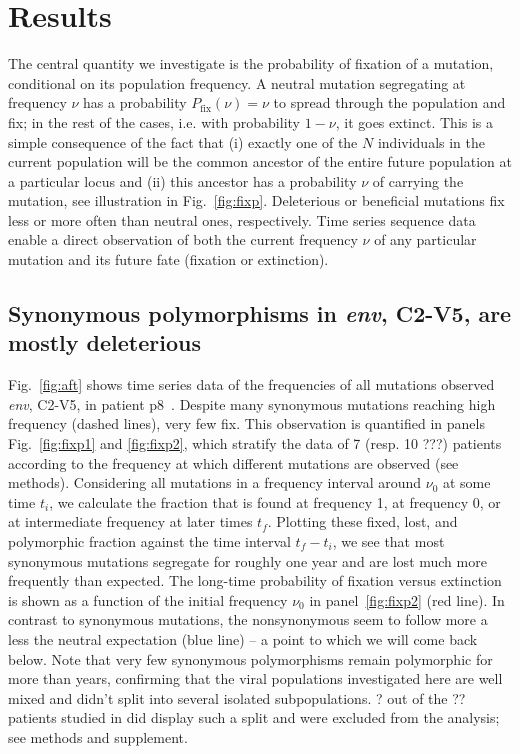 \documentclass[rmp, twocolumn]{revtex4}
\newcommand{\FIG}[1]{Fig.~\ref{fig:#1}}
\newcommand{\env}{\textit{env}}
\begin{document}
\section{Results}

The central quantity we investigate is the probability of fixation of a
mutation, conditional on its population frequency.  A neutral mutation
segregating at frequency $\nu$ has a probability $P_\text{fix}(\nu) = \nu$ to
spread through the population and fix; in the rest of the cases, i.e. with
probability $1-\nu$, it goes extinct. This is a simple consequence of the fact
that (i) exactly one of the $N$ individuals in the current population will be
the common ancestor of the entire future population at a particular locus and
(ii) this ancestor has a probability $\nu$ of carrying the mutation, see
illustration in \FIG{fixp}.  Deleterious or beneficial mutations fix less or
more often than neutral ones, respectively. Time series sequence data enable a
direct observation of both the current frequency $\nu$ of any particular
mutation and its future fate (fixation or extinction). 


\subsection{Synonymous polymorphisms in \env, C2-V5, are mostly deleterious}

\FIG{aft} shows time series data of the frequencies of all mutations observed
\env, C2-V5, in patient p8~\citep{shankarappa_consistent_1999}. Despite many
synonymous mutations reaching high frequency (dashed lines), very few fix. This
observation is quantified in panels \FIG{fixp1} and \ref{fig:fixp2}, which
stratify the data of 7 (resp. 10 ???) patients according to the frequency at
which different mutations are observed (see methods). Considering all mutations in a
frequency interval around $\nu_0$ at some time $t_i$, we calculate the fraction
that is found at frequency 1, at frequency 0, or at intermediate frequency at
later times $t_f$. Plotting these fixed, lost, and polymorphic fraction against
the time interval $t_f-t_i$, we see that most synonymous mutations segregate for
roughly one year and are lost much more frequently than expected. The long-time
probability of fixation versus extinction is shown as a function of the initial
frequency $\nu_0$ in panel~\ref{fig:fixp2} (red line). In contrast to synonymous
mutations, the nonsynonymous seem to follow more a less the neutral expectation
(blue line) -- a point to which we will come back below. Note that very few
synonymous polymorphisms remain polymorphic for more than years, confirming that
the viral populations investigated here are well mixed and didn't split into
several isolated subpopulations. ? out of the ?? patients studied in
\citet{shankarappa_consistent_1999} did display such a split and were excluded
from the analysis; see methods and supplement.
\end{document}
